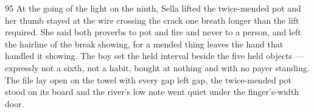 \begin{CRchronicle}{95}
At the going of the light on the ninth, Sella lifted the twice-mended pot and her thumb stayed at the wire crossing the crack one breath longer than the lift required. She said both proverbs to pot and fire and never to a person, and left the hairline of the break showing, for a mended thing leaves the hand that handled it showing. The boy set the held interval beside the five held objects --- expressly not a sixth, not a habit, bought at nothing and with no payer standing. The file lay open on the towel with every gap left gap, the twice-mended pot stood on its board and the river’s low note went quiet under the finger’s-width door.
\end{CRchronicle}
